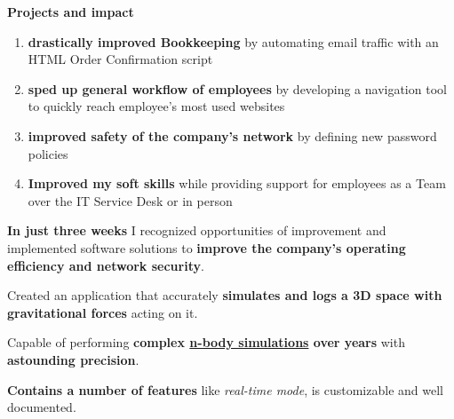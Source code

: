 \documentclass[]{jonas-cv}
\begin{document}
\hfill
\begin{minipage}[t]{0.63\textwidth} 



\sectionsep

\begin{tightemize}
    \item \textbf{Projects and impact}
    \begin{enumerate}
        \item \textbf{drastically improved Bookkeeping} by automating email traffic with an HTML Order Confirmation script
        \item \textbf{sped up general workflow of employees} by developing a navigation tool to quickly reach employee's most used websites
        \item \textbf{improved safety of the company's network} by defining new password policies
        \item \textbf{Improved my soft skills} while providing support for employees as a Team over the IT Service Desk or in person
    \end{enumerate}
    \vspace{1mm}

    \item [\faicon{angle-double-right}] \textbf{In just three weeks} I recognized opportunities of improvement and implemented software solutions
    to \textbf{improve the company's operating efficiency and network security}.
\end{tightemize}
\largesectionsep




\begin{tightemize}
    \item Created an application that accurately \textbf{simulates and logs a 3D space with gravitational forces} acting on it.
    \item Capable of performing \textbf{complex \href{https://en.wikipedia.org/wiki/N-body_problem}{n-body simulations} over years} with \textbf{astounding precision}.
    \item \textbf{Contains a number of features} like \emph{real-time mode}, is customizable and well documented.


\end{tightemize}
\end{minipage}
\end{document}
